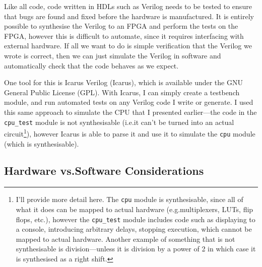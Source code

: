 \documentclass[12pt]{article}
\begin{document}
Like all code, code written in HDLs such as Verilog needs to be tested to ensure that bugs are found and fixed before the hardware is manufactured. It is entirely possible to synthesise the Verilog to an FPGA and perform the tests on the FPGA, however this is difficult to automate, since it requires interfacing with external hardware. If all we want to do is simple verification that the Verilog we wrote is correct, then we can just simulate the Verilog in software and automatically check that the code behaves as we expect.

One tool for this is Icarus Verilog (Icarus), which is available under the GNU General Public License (GPL). With Icarus, I can simply create a testbench module, and run automated tests on any Verilog code I write or generate. I used this same approach to simulate the CPU that I presented earlier---the code in the \lstinline[language=Verilog]|cpu_test| module is not synthesisable (i.e.\@ it can't be turned into an actual circuit\footnote{I'll provide more detail here. The \lstinline[language=Verilog]|cpu| module is synthesisable, since all of what it does can be mapped to actual hardware (e.g.\@ multiplexers, LUTs, flip flops, etc.\@), however the \lstinline[language=Verilog]|cpu_test| module includes code such as displaying to a console, introducing arbitrary delays, stopping execution, which cannot be mapped to actual hardware. Another example of something that is not synthesisable is division---unless it is division by a power of 2 in which case it is synthesised as a right shift.}), however Icarus is able to parse it and use it to simulate the \lstinline[language=Verilog]|cpu| module (which is synthesisable).

\subsection{Hardware vs.\@ Software Considerations}
\end{document}
